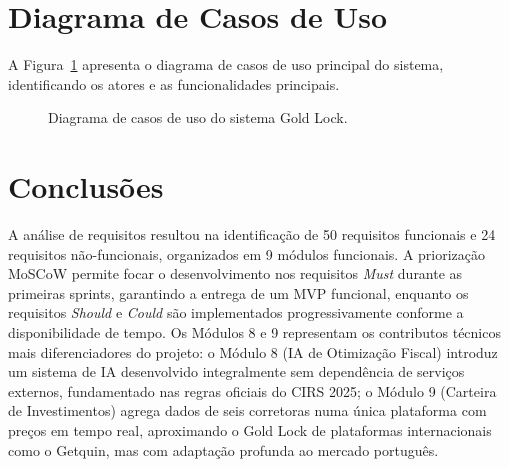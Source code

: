 \section{Diagrama de Casos de Uso}
\label{sec:req-casos-uso}

A Figura~\ref{fig:casos-uso} apresenta o diagrama de casos de uso principal do sistema, identificando os atores e as funcionalidades principais.

\begin{figure}[H]
\centering

\caption{Diagrama de casos de uso do sistema Gold Lock.}
\label{fig:casos-uso}
\end{figure}


\section{Conclusões}
\label{sec:req-conclusoes}

A análise de requisitos resultou na identificação de 50 requisitos funcionais e 24 requisitos não-funcionais, organizados em 9 módulos funcionais. A priorização MoSCoW permite focar o desenvolvimento nos requisitos \textit{Must} durante as primeiras sprints, garantindo a entrega de um \ac{MVP} funcional, enquanto os requisitos \textit{Should} e \textit{Could} são implementados progressivamente conforme a disponibilidade de tempo. Os Módulos 8 e 9 representam os contributos técnicos mais diferenciadores do projeto: o Módulo 8 (\ac{IA} de Otimização Fiscal) introduz um sistema de \ac{IA} desenvolvido integralmente sem dependência de serviços externos, fundamentado nas regras oficiais do \ac{CIRS} 2025; o Módulo 9 (Carteira de Investimentos) agrega dados de seis corretoras numa única plataforma com preços em tempo real, aproximando o Gold Lock de plataformas internacionais como o Getquin, mas com adaptação profunda ao mercado português.
